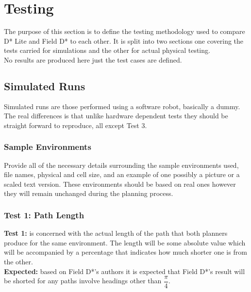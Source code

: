 \chapter{Testing}

\noindent
The purpose of this section is to define the testing methodology used to compare D* Lite and Field D* to each other. It is split into two sections one covering the tests carried for simulations and the other for actual physical testing.\\

\noindent
No results are produced here just the test cases are defined. 


\section{Simulated Runs}

\noindent
Simulated runs are those performed using a software robot, basically a dummy. The real differences is that unlike hardware dependent tests they should be straight forward to reproduce, all except Test 3.

\subsection{Sample Environments}

\noindent
Provide all of the necessary details surrounding the sample environments used, file names, physical and cell size, and an example of one possibly a picture or a scaled text version. These environments should be based on real ones however they will remain unchanged during the planning process.

\subsection{Test 1: Path Length}

\noindent
\textbf{Test 1:} is concerned with the actual length of the path that both planners produce for the same environment. The length will be some absolute value which will be accompanied by a percentage that indicates how much shorter one is from the other.\\

\noindent
\textbf{Expected:} based on Field D*'s authors it is expected that Field D*'s result will be shorted for any paths involve headings other than $\dfrac{\pi}{4}$.\\

